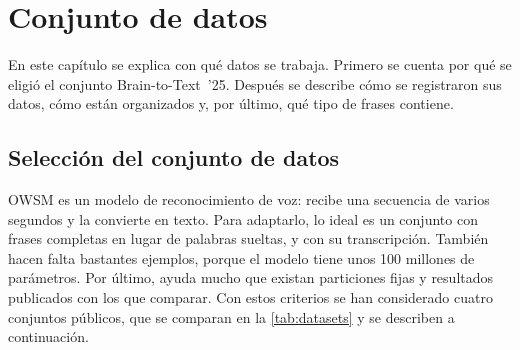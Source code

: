 
\chapter{Conjunto de datos}
\label{cap:datos}

En este capítulo se explica con qué datos se trabaja. Primero se cuenta por qué se eligió el conjunto Brain-to-Text~'25. Después se describe cómo se registraron sus datos, cómo están organizados y, por último, qué tipo de frases contiene.

\section{Selección del conjunto de datos}
\label{sec:seleccion-datos}

OWSM es un modelo de reconocimiento de voz: recibe una secuencia de varios segundos y la convierte en texto. Para adaptarlo, lo ideal es un conjunto con frases completas en lugar de palabras sueltas, y con su transcripción. También hacen falta bastantes ejemplos, porque el modelo tiene unos 100 millones de parámetros. Por último, ayuda mucho que existan particiones fijas y resultados publicados con los que comparar. Con estos criterios se han considerado cuatro conjuntos públicos, que se comparan en la \cref{tab:datasets} y se describen a continuación.


